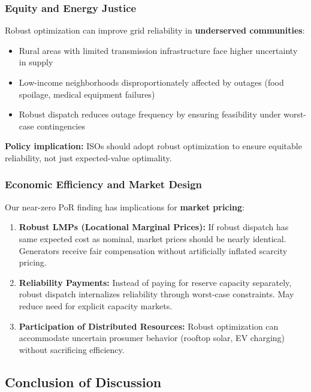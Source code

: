 \subsubsection{Equity and Energy Justice}

Robust optimization can improve grid reliability in \textbf{underserved communities}:
\begin{itemize}
    \item Rural areas with limited transmission infrastructure face higher uncertainty in supply
    \item Low-income neighborhoods disproportionately affected by outages (food spoilage, medical equipment failures)
    \item Robust dispatch reduces outage frequency by ensuring feasibility under worst-case contingencies
\end{itemize}

\textbf{Policy implication:} ISOs should adopt robust optimization to ensure equitable reliability, not just expected-value optimality.

\subsubsection{Economic Efficiency and Market Design}

Our near-zero PoR finding has implications for \textbf{market pricing}:
\begin{enumerate}
    \item \textbf{Robust LMPs (Locational Marginal Prices):} If robust dispatch has same expected cost as nominal, market prices should be nearly identical. Generators receive fair compensation without artificially inflated scarcity pricing.

    \item \textbf{Reliability Payments:} Instead of paying for reserve capacity separately, robust dispatch internalizes reliability through worst-case constraints. May reduce need for explicit capacity markets.

    \item \textbf{Participation of Distributed Resources:} Robust optimization can accommodate uncertain prosumer behavior (rooftop solar, EV charging) without sacrificing efficiency.
\end{enumerate}

\subsection{Conclusion of Discussion}

